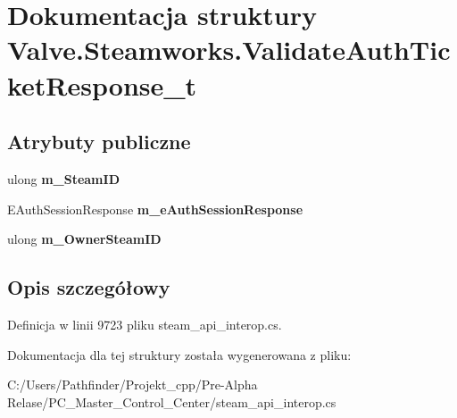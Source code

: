 \hypertarget{struct_valve_1_1_steamworks_1_1_validate_auth_ticket_response__t}{}\section{Dokumentacja struktury Valve.\+Steamworks.\+Validate\+Auth\+Ticket\+Response\+\_\+t}
\label{struct_valve_1_1_steamworks_1_1_validate_auth_ticket_response__t}
\subsection*{Atrybuty publiczne}
\begin{DoxyCompactItemize}
\item 
\mbox{\label{struct_valve_1_1_steamworks_1_1_validate_auth_ticket_response__t_abddacfbeab9643cce489669a480bddae}} 
ulong {\bfseries m\+\_\+\+Steam\+ID}
\item 
\mbox{\label{struct_valve_1_1_steamworks_1_1_validate_auth_ticket_response__t_a4cf0a0c6482bbe28261665b1f562ff1a}} 
E\+Auth\+Session\+Response {\bfseries m\+\_\+e\+Auth\+Session\+Response}
\item 
\mbox{\label{struct_valve_1_1_steamworks_1_1_validate_auth_ticket_response__t_a9b8b443f1f3078b711774bccf35c1456}} 
ulong {\bfseries m\+\_\+\+Owner\+Steam\+ID}
\end{DoxyCompactItemize}


\subsection{Opis szczegółowy}


Definicja w linii 9723 pliku steam\+\_\+api\+\_\+interop.\+cs.



Dokumentacja dla tej struktury została wygenerowana z pliku\+:\begin{DoxyCompactItemize}
\item 
C\+:/\+Users/\+Pathfinder/\+Projekt\+\_\+cpp/\+Pre-\/\+Alpha Relase/\+P\+C\+\_\+\+Master\+\_\+\+Control\+\_\+\+Center/steam\+\_\+api\+\_\+interop.\+cs\end{DoxyCompactItemize}
